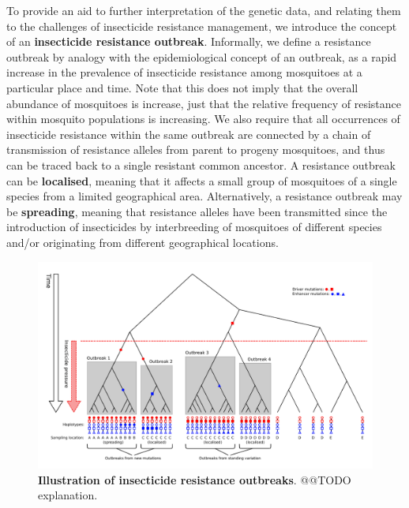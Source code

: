 \documentclass[a4paper,11pt,abstracton]{scrartcl}
\begin{document}
%
To provide an aid to further interpretation of the genetic data, and relating them to the challenges of insecticide resistance management, we introduce the concept of an \textbf{insecticide resistance outbreak}.
%
Informally, we define a resistance outbreak by analogy with the epidemiological concept of an outbreak, as a rapid increase in the prevalence of insecticide resistance among mosquitoes at a particular place and time.
%
Note that this does not imply that the overall abundance of mosquitoes is increase, just that the relative frequency of resistance within mosquito populations is increasing.
%
We also require that all occurrences of insecticide resistance within the same outbreak are connected by a chain of transmission of resistance alleles from parent to progeny mosquitoes, and thus can be traced back to a single resistant common ancestor.
%
A resistance outbreak can be \textbf{localised}, meaning that it affects a small group of mosquitoes of a single species from a limited geographical area.
%
Alternatively, a resistance outbreak may be \textbf{spreading}, meaning that resistance alleles have been transmitted since the introduction of insecticides by interbreeding of mosquitoes of different species and/or originating from different geographical locations.
%


%
\begin{figure}[!b]
  \includegraphics[width=1.1\linewidth,center]{artwork/outbreaks.pdf}
  \caption{\textbf{Illustration of insecticide resistance outbreaks}. @@TODO explanation.}
  \label{fig:outbreaks}
\end{figure}
\end{document}
